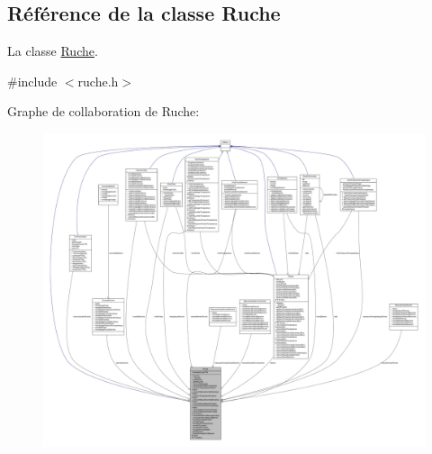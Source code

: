 \hypertarget{class_ruche}{}\subsection{Référence de la classe Ruche}
\label{class_ruche}


La classe \hyperlink{class_ruche}{Ruche}.  




{\ttfamily \#include $<$ruche.\+h$>$}



Graphe de collaboration de Ruche\+:\nopagebreak
\begin{figure}[H]
\begin{center}
\leavevmode
\includegraphics[width=350pt]{class_ruche__coll__graph}
\end{center}
\end{figure}
